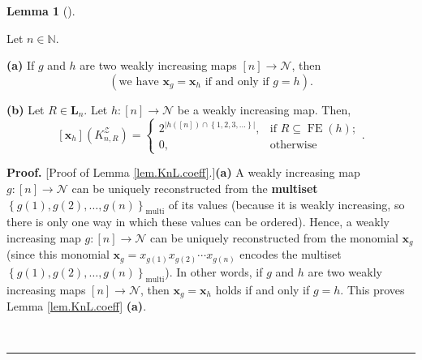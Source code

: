 \documentclass[numbers=enddot,12pt,final,onecolumn,notitlepage]{scrartcl}%
\theoremstyle{definition}
\newtheorem{lem}[theo]{Lemma}
\newenvironment{lemma}[1][]
{\begin{lem}[#1]\begin{leftbar}}
{\end{leftbar}\end{lem}}
\newenvironment{proof}[1][Proof]{\noindent\textbf{#1.} }{\ \rule{0.5em}{0.5em}}
\newenvironment{vershort}{}{}
\newcommand{\xx}{\mathbf{x}}
\begin{document}
\begin{vershort}
\begin{lemma}
\label{lem.KnL.coeff}Let $n\in\mathbb{N}$.

\textbf{(a)} If $g$ and $h$ are two weakly increasing maps $\left[  n\right]
\rightarrow\mathcal{N}$, then
\[
\left(\text{we have $\xx_g = \xx_h$ if and only if $g = h$}\right) .
\]


\textbf{(b)} Let $R\in\mathbf{L}_{n}$. Let $h:\left[  n\right]  \rightarrow
\mathcal{N}$ be a weakly increasing map. Then,%
\[
\left[  \mathbf{x}_{h}\right]  \left(  K_{n,R}^{\mathcal{Z}}\right)  =%
\begin{cases}
2^{\left\vert h\left(  \left[  n\right]  \right)  \cap\left\{  1,2,3,\ldots
\right\}  \right\vert }, & \text{if }R\subseteq\operatorname*{FE}\left(
h\right)  ;\\
0, & \text{otherwise}%
\end{cases}
.
\]

\end{lemma}

\begin{proof}
[Proof of Lemma \ref{lem.KnL.coeff}.]\textbf{(a)} A weakly increasing map
$g:\left[  n\right]  \rightarrow\mathcal{N}$ can be uniquely reconstructed
from the \textbf{multiset} $\left\{  g\left(  1\right)  ,g\left(  2\right)
,\ldots,g\left(  n\right)  \right\}  _{\operatorname*{multi}}$ of its values
(because it is weakly increasing, so there is only one way in which these
values can be ordered). Hence, a weakly increasing map $g:\left[  n\right]
\rightarrow\mathcal{N}$ can be uniquely reconstructed from the monomial
$\mathbf{x}_{g}$ (since this monomial
$\mathbf{x}_{g}=x_{g\left(1\right)}x_{g\left(2\right)}\cdots
x_{g\left(n\right)}$
encodes the multiset $\left\{  g\left(  1\right)  ,g\left(
2\right)  ,\ldots,g\left(  n\right)  \right\}  _{\operatorname*{multi}}$). In
other words, if $g$ and $h$ are two weakly increasing maps $\left[  n\right]
\rightarrow\mathcal{N}$, then $\mathbf{x}_{g}=\mathbf{x}_{h}$ holds if and
only if $g=h$. This proves Lemma \ref{lem.KnL.coeff} \textbf{(a)}.


\end{proof}
\end{vershort}
\end{document}
